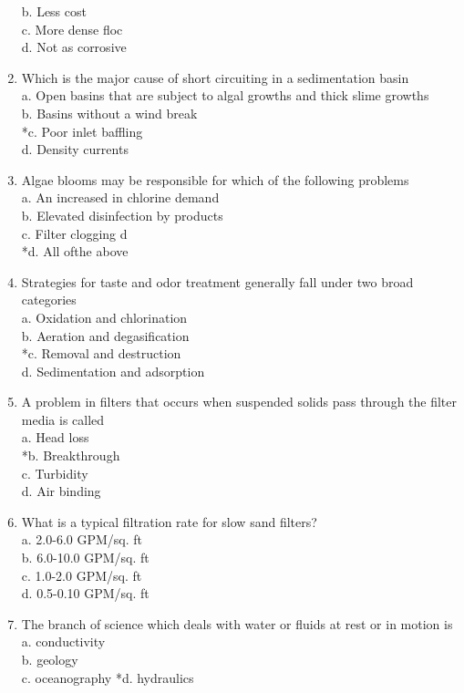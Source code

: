 \begin{enumerate}
b.  Less cost\\
c.  More dense floc\\
d.  Not as corrosive\\
\item Which is the major cause of short circuiting in a sedimentation basin\\
a.  Open basins that are subject to algal growths and thick slime growths\\
b.  Basins without a wind break\\
*c.  Poor inlet baffling\\
d.  Density currents\\
\item Algae blooms may be responsible for which of the following problems\\
a.  An increased in chlorine demand\\
b.  Elevated disinfection by products\\
c.  Filter clogging d\\
*d.  All ofthe above\\
\item Strategies for taste and odor treatment generally fall under two broad categories\\
a.  Oxidation and chlorination\\
b.  Aeration and degasification\\
*c.  Removal and destruction\\
d.  Sedimentation and adsorption\\
\item A problem in filters that occurs when suspended solids pass through the filter media is called\\
a.  Head loss\\
*b.  Breakthrough\\
c.  Turbidity\\
d.  Air binding\\
\item What is a typical filtration rate for slow sand filters?\\
a.  2.0-6.0 GPM/sq. ft\\
b.  6.0-10.0 GPM/sq. ft\\
c.  1.0-2.0 GPM/sq. ft\\
d.  0.5-0.10 GPM/sq. ft\\
\item The branch of science which deals with water or fluids at rest or in motion is\\
a.  conductivity\\
b.  geology\\
c.  oceanography
*d.  hydraulics\\


\end{enumerate}
